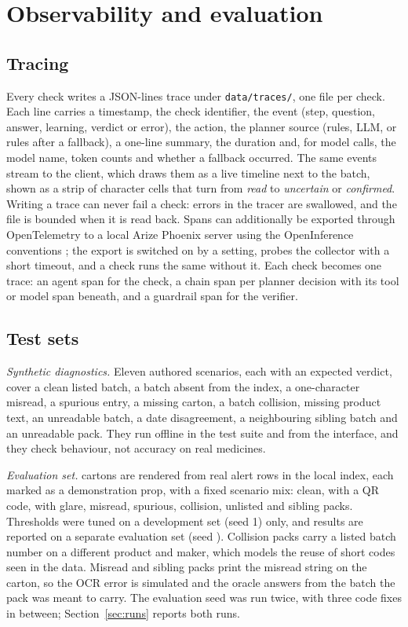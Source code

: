 \section{Observability and evaluation}
\label{sec:eval}

\subsection{Tracing}
Every check writes a JSON-lines trace under \texttt{data/traces/}, one file per check. Each line carries a timestamp, the check identifier, the event (step, question, answer, learning, verdict or error), the action, the planner source (rules, LLM, or rules after a fallback), a one-line summary, the duration and, for model calls, the model name, token counts and whether a fallback occurred. The same events stream to the client, which draws them as a live timeline next to the batch, shown as a strip of character cells that turn from \emph{read} to \emph{uncertain} or \emph{confirmed}. Writing a trace can never fail a check: errors in the tracer are swallowed, and the file is bounded when it is read back. Spans can additionally be exported through OpenTelemetry to a local Arize Phoenix server using the OpenInference conventions \cite{otel2026genai,arize2026openinference}; the export is switched on by a setting, probes the collector with a short timeout, and a check runs the same without it. Each check becomes one trace: an agent span for the check, a chain span per planner decision with its tool or model span beneath, and a guardrail span for the verifier.

\subsection{Test sets}
\emph{Synthetic diagnostics.} Eleven authored scenarios, each with an expected verdict, cover a clean listed batch, a batch absent from the index, a one-character misread, a spurious entry, a missing carton, a batch collision, missing product text, an unreadable batch, a date disagreement, a neighbouring sibling batch and an unreadable pack. They run offline in the test suite and from the interface, and they check behaviour, not accuracy on real medicines.

\emph{Evaluation set.}  cartons are rendered from real alert rows in the local index, each marked as a demonstration prop, with a fixed scenario mix:  clean,  with a QR code,  with glare,  misread,  spurious,  collision,  unlisted and  sibling packs. Thresholds were tuned on a development set (seed 1) only, and results are reported on a separate evaluation set (seed ). Collision packs carry a listed batch number on a different product and maker, which models the reuse of short codes seen in the data. Misread and sibling packs print the misread string on the carton, so the OCR error is simulated and the oracle answers from the batch the pack was meant to carry. The evaluation seed was run twice, with three code fixes in between; Section~\ref{sec:runs} reports both runs.

